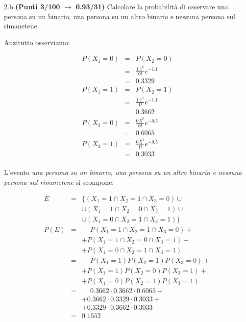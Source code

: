 \documentclass[
  11pt,
]{book}
\theoremstyle{mytheoremstyle}
\theoremstyle{mydefstyle}
\newenvironment{sol}
  {
  \begin{tcolorbox}[enhanced,breakable,arc=0.1mm,boxrule=1pt,colback=white,colframe=iblue,
  title=\bf \fontfamily{lmss}\selectfont \hspace{.5 cm} Soluzione,drop fuzzy shadow]

}{
\end{tcolorbox}
  }
\begin{document}
2.b \textbf{(Punti 3/100 \(\rightarrow\) 0.93/31)} Calcolare la probabilità di osservare una persona su un binario, una persona su un altro binario e nessuna persona sul rimanetene.

\begin{sol}
Anzitutto osserviamo:

\begin{eqnarray*}
P(X_1= 0) &=& P(X_2=0)\\
          &=& \frac{1.1^0}{0!}e^{-1.1}\\
          &=& 0.3329\\
P(X_1= 1) &=& P(X_2=1)\\
          &=& \frac{1.1^1}{1!}e^{-1.1}\\
          &=& 0.3662\\
P(X_3= 0) &=& \frac{0.5^0}{0!}e^{-0.5}\\
          &=& 0.6065\\
P(X_3= 1) &=& \frac{0.5^1}{1!}e^{-0.5}\\
          &=& 0.3033\\
\end{eqnarray*}

L'evento \emph{una persona su un binario, una persona su un altro binario e nessuna persona sul rimanetene}
si scompone:

\begin{eqnarray*}
E &=& \big\{(X_1=1\cap X_2=1\cap X_3=0)\cup\\
   &&\cup(X_1=1\cap X_2=0\cap X_3=1)\cup\\
   &&\cup(X_1=0\cap X_2=1\cap X_3=1)\big\}\\
P(E) &=& \phantom{+} P(X_1=1\cap X_2=1\cap X_3=0)+\\
     && + P(X_1=1\cap X_2=0\cap X_3=1)+\\
     && + P(X_1=0\cap X_2=1\cap X_3=1)\\
     &=& \phantom{+} P(X_1=1)P(X_2=1)P(X_3=0)+\\
     && + P(X_1=1)P(X_2=0)P(X_3=1)+\\
     && + P(X_1=0)P(X_2=1)P(X_3=1)\\
     &=& \phantom{+} 0.3662\cdot0.3662\cdot0.6065+\\
     && +0.3662\cdot0.3329\cdot0.3033+\\
     && +0.3329\cdot0.3662\cdot0.3033\\
     &=& 0.1552
\end{eqnarray*}

\end{sol}
\end{document}
